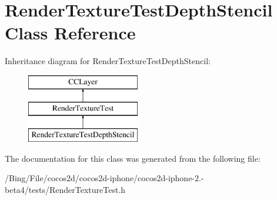 \hypertarget{interface_render_texture_test_depth_stencil}{\section{Render\-Texture\-Test\-Depth\-Stencil Class Reference}
\label{interface_render_texture_test_depth_stencil}
}
Inheritance diagram for Render\-Texture\-Test\-Depth\-Stencil\-:\begin{figure}[H]
\begin{center}
\leavevmode
\includegraphics[height=3.000000cm]{interface_render_texture_test_depth_stencil}
\end{center}
\end{figure}


The documentation for this class was generated from the following file\-:\begin{DoxyCompactItemize}
\item 
/\-Bing/\-File/cocos2d/cocos2d-\/iphone/cocos2d-\/iphone-\/2.-\/beta4/tests/Render\-Texture\-Test.\-h\end{DoxyCompactItemize}
